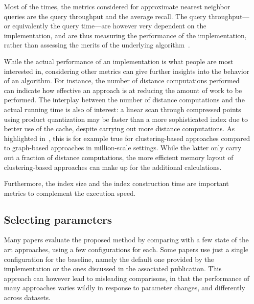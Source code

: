 \documentclass[11pt]{article}
\begin{document}
Most of the times, the metrics considered for approximate
nearest neighbor queries are the query throughput and the average recall.
The query throughput---or equivalently the query time---are
however very dependent on the implementation, and are thus
measuring the performance of the implementation, rather than assessing the
merits of the underlying algorithm~\cite{DBLP:journals/kais/KriegelSZ17}.

While the actual performance of an implementation is what people are most
interested in, considering other metrics can give further insights into the
behavior of an algorithm. For instance, the number of distance
computations performed can indicate how effective an approach is at reducing
the amount of work to be performed. The interplay between the number of
distance computations and the actual running time is also of interest: a linear
scan through compressed points using product quantization may be faster than a more
sophisticated index due to better use of the cache, despite carrying out more distance
computations.
As highlighted in~\cite{DBLP:journals/corr/abs-2305-04359}, this is for example true for clustering-based
approaches compared to graph-based approaches in million-scale settings.
While the latter only carry out a fraction of distance computations, the more efficient memory layout of clustering-based approaches can make up for the additional calculations.


Furthermore, the index size and the index construction time are important
metrics to complement the execution speed.


\subsection{Selecting parameters}

Many papers evaluate the proposed method by comparing with a few state of
the art approaches, using a few configurations for each.
Some papers use just a single configuration for the baseline,
namely the default one provided by the implementation or the ones discussed in the associated publication.
This approach can however lead to misleading comparisons, in that the
performance of many approaches varies wildly in response to parameter
changes, and differently across datasets.
\end{document}
